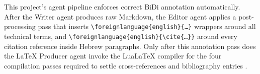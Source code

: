 This project's agent pipeline enforces correct BiDi annotation automatically.
After the Writer agent produces raw Markdown, the Editor agent applies a
post-processing pass that inserts
\texttt{\textbackslash foreignlanguage\{english\}\{\ldots\}} wrappers around
all technical terms, and
\texttt{\textbackslash foreignlanguage\{english\}\{\textbackslash cite\{\ldots\}\}}
around every citation reference inside Hebrew paragraphs.
Only after this annotation pass does the LaTeX Producer agent invoke
the LuaLaTeX compiler for the four compilation passes required to settle
cross-references and bibliography entries \cite{CrewAI2024}.